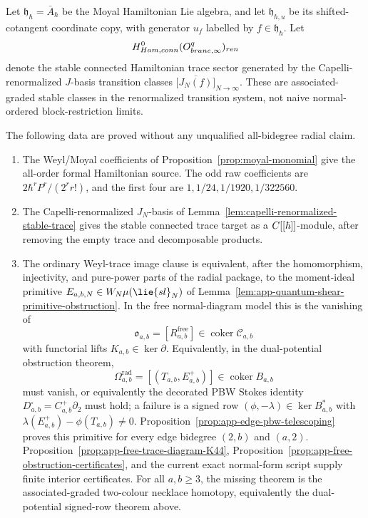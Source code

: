 \documentclass[11pt]{memoir}
\begin{document}
\begin{thm}\label{thm:phi-hbar-all-order}
  Let $\mathfrak h_\hbar=\bar A_\hbar$ be the Moyal Hamiltonian Lie algebra,
  and let \(\mathfrak h_{\hbar,u}\) be its shifted-cotangent coordinate
  copy, with generator \(u_f\) labelled by \(f\in\mathfrak h_\hbar\). Let
  $$H^0_{Ham,conn}
    (O^{q}_{brane,\infty})_{ren}$$
  denote the stable connected Hamiltonian trace sector generated by the
  Capelli-renormalized \(J\)-basis transition classes
  $\bigl[\overline{J_N(f)}\bigr]_{N\to\infty}$.  These are
  associated-graded stable classes in the renormalized transition system,
  not naive normal-ordered block-restriction limits.

  The following data are proved without any unqualified all-bidegree
  radial claim.
  \begin{enumerate}
    \item The Weyl/Moyal coefficients of
      Proposition~\ref{prop:moyal-monomial} give the all-order formal
      Hamiltonian source.  The odd raw coefficients are
      \(2\hbar^rP^r/(2^r r!)\), and the first four are
      \(1,1/24,1/1920,1/322560\).
    \item The Capelli-renormalized \(J_N\)-basis of
      Lemma~\ref{lem:capelli-renormalized-stable-trace} gives the stable
      connected trace target as a \(C[[\hbar]]\)-module, after removing
      the empty trace and decomposable products.
    \item The ordinary Weyl-trace image clause is equivalent, after the
      homomorphism, injectivity, and pure-power parts of the radial
      package, to the moment-ideal primitive
      \(E_{a,b,N}\in\mathcal W_N\widehat\mu(\lie{sl}_N)\) of
      Lemma~\ref{lem:app-quantum-shear-primitive-obstruction}.  In the
      free normal-diagram model this is the vanishing of
      \[
        \mathfrak o_{a,b}
        =[R^{\mathrm{free}}_{a,b}]
        \in\operatorname{coker}\mathcal C_{a,b}
      \]
      with functorial lifts \(K_{a,b}\in\ker\partial\).
      Equivalently, in the dual-potential obstruction theorem,
      \[
        \Omega^{\mathrm{rad}}_{a,b}
        =
        [(T_{a,b},E^+_{a,b})]\in\operatorname{coker}B_{a,b}
      \]
      must vanish, or equivalently the decorated PBW Stokes identity
      \(D^\square_{a,b}=C^+_{a,b}\partial_2\) must hold; a failure is a
      signed row \((\phi,-\lambda)\in\ker B_{a,b}^*\) with
      \(\lambda(E^+_{a,b})-\phi(T_{a,b})\ne0\).
      Proposition~\ref{prop:app-edge-pbw-telescoping} proves this
      primitive for every edge bidegree \((2,b)\) and \((a,2)\).
      Proposition~\ref{prop:app-free-trace-diagram-K44},
      Proposition~\ref{prop:app-free-obstruction-certificates}, and the
      current exact normal-form script supply finite interior
      certificates.  For all \(a,b\geq3\), the missing theorem is the
      associated-graded two-colour necklace homotopy, equivalently the
      dual-potential signed-row theorem above.
  \end{enumerate}


\end{thm}
\end{document}

